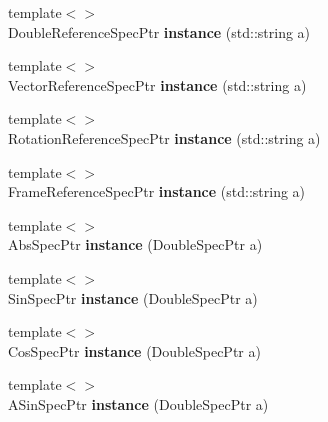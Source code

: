 \begin{DoxyCompactItemize}
\item 
\hypertarget{namespacegiskard__suturo_af6dc7323dd138002eff83ce41441c6f8}{{\footnotesize template$<$$>$ }\\Double\-Reference\-Spec\-Ptr {\bfseries instance} (std\-::string a)}\label{namespacegiskard__suturo_af6dc7323dd138002eff83ce41441c6f8}

\item 
\hypertarget{namespacegiskard__suturo_a017da3c52493ce754a4dbd565b975f3c}{{\footnotesize template$<$$>$ }\\Vector\-Reference\-Spec\-Ptr {\bfseries instance} (std\-::string a)}\label{namespacegiskard__suturo_a017da3c52493ce754a4dbd565b975f3c}

\item 
\hypertarget{namespacegiskard__suturo_a4ed033b251f79ac4cb8321089fae8efc}{{\footnotesize template$<$$>$ }\\Rotation\-Reference\-Spec\-Ptr {\bfseries instance} (std\-::string a)}\label{namespacegiskard__suturo_a4ed033b251f79ac4cb8321089fae8efc}

\item 
\hypertarget{namespacegiskard__suturo_a3b320ea47177fdfa9e538b43f76160a6}{{\footnotesize template$<$$>$ }\\Frame\-Reference\-Spec\-Ptr {\bfseries instance} (std\-::string a)}\label{namespacegiskard__suturo_a3b320ea47177fdfa9e538b43f76160a6}

\item 
\hypertarget{namespacegiskard__suturo_a5355e0f423bb848ef35e2cbb961f3cec}{{\footnotesize template$<$$>$ }\\Abs\-Spec\-Ptr {\bfseries instance} (Double\-Spec\-Ptr a)}\label{namespacegiskard__suturo_a5355e0f423bb848ef35e2cbb961f3cec}

\item 
\hypertarget{namespacegiskard__suturo_a3cfc418aedb53f953697b5fa172efe68}{{\footnotesize template$<$$>$ }\\Sin\-Spec\-Ptr {\bfseries instance} (Double\-Spec\-Ptr a)}\label{namespacegiskard__suturo_a3cfc418aedb53f953697b5fa172efe68}

\item 
\hypertarget{namespacegiskard__suturo_acf63d5161dabbc6850833a89dc3f9091}{{\footnotesize template$<$$>$ }\\Cos\-Spec\-Ptr {\bfseries instance} (Double\-Spec\-Ptr a)}\label{namespacegiskard__suturo_acf63d5161dabbc6850833a89dc3f9091}

\item 
\hypertarget{namespacegiskard__suturo_a7b2d070ea867cae10812fa94ff308c8d}{{\footnotesize template$<$$>$ }\\A\-Sin\-Spec\-Ptr {\bfseries instance} (Double\-Spec\-Ptr a)}\label{namespacegiskard__suturo_a7b2d070ea867cae10812fa94ff308c8d}


\end{DoxyCompactItemize}

